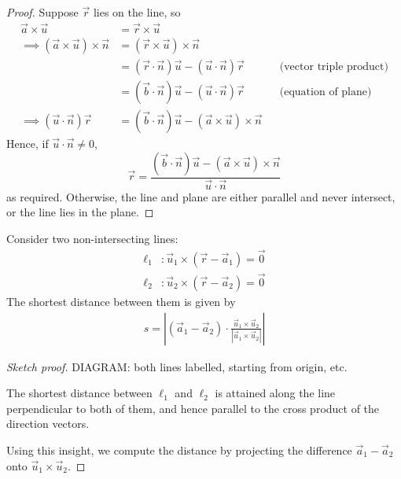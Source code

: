 \documentclass{../template/note}
\begin{document}
    \begin{proof}
        Suppose \(\vec r\) lies on the line, so
        \begin{align*}
            \vec a \times \vec u &= \vec r \times \vec u \\
            \implies (\vec a \times \vec u) \times \vec n &= (\vec r \times \vec u) \times \vec n \\
            &= (\vec r \cdot \vec n) \vec u - (\vec u \cdot \vec n) \vec r && \text{(vector triple product)} \\
            &= (\vec b \cdot \vec n) \vec u - (\vec u \cdot \vec n) \vec r && \text{(equation of plane)} \\
            \implies (\vec u \cdot \vec n) \vec r &= (\vec b \cdot \vec n) \vec u - (\vec a \times \vec u) \times \vec n
        \end{align*}
        Hence, if \(\vec u \cdot \vec n \neq 0\),
        \[
            \vec r = \frac{(\vec b \cdot \vec n)\vec u - (\vec a \times \vec u) \times \vec n}{\vec u \cdot \vec n}
        \]
        as required. Otherwise, the line and plane are either parallel and never intersect, or the line lies in the plane.
        
    \end{proof}
    
    
    


    \begin{proposition}
        Consider two non-intersecting lines:
        \begin{align*}
            \ell_1 &: \vec u_1 \times (\vec r - \vec a_1) = \vec 0 \\
            \ell_2 &: \vec u_2 \times (\vec r - \vec a_2) = \vec 0
        \end{align*}
        The shortest distance between them is given by
        \begin{align*}
            s = \left|(\vec a_1 - \vec a_2) \cdot \frac{\vec u_1 \times \vec u_2}{|\vec u_1 \times \vec u_2|}\right|
        \end{align*}
    \end{proposition}
    
    \begin{proof}[Sketch proof]
        DIAGRAM: both lines labelled, starting from origin, etc.

        The shortest distance between \(\ell_1\) and \(\ell_2\) is attained along the line perpendicular to both of them, and hence parallel to the cross product of the direction vectors.

        Using this insight, we compute the distance by projecting the difference \(\vec a_1 - \vec a_2\) onto \(\vec u_1 \times \vec u_2\).
    \end{proof}
    
\end{document}
